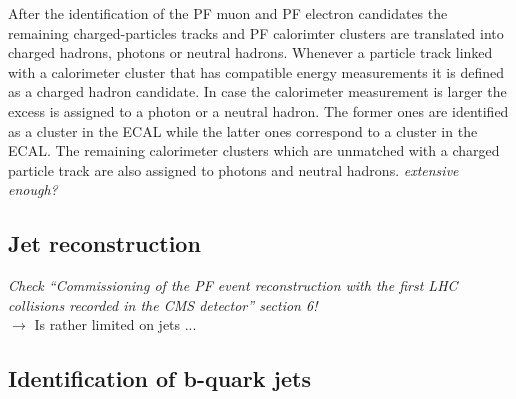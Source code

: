 After the identification of the PF muon and PF electron candidates the remaining charged-particles tracks and PF calorimter clusters are translated into charged hadrons, photons or neutral hadrons.
Whenever a particle track linked with a calorimeter cluster that has compatible energy measurements it is defined as a charged hadron candidate. In case the calorimeter measurement is larger the excess is assigned to a photon or a neutral hadron. The former ones are identified as a cluster in the ECAL while the latter ones correspond to a cluster in the ECAL. The remaining calorimeter clusters which are unmatched with a charged particle track are also assigned to photons and neutral hadrons. \textit{extensive enough?}

\subsection{Jet reconstruction}
 \textit{Check ``Commissioning of the PF event reconstruction with the first LHC collisions recorded in the CMS detector'' section 6!}\\
 $\rightarrow$ Is rather limited on jets ...

\subsection{Identification of b-quark jets}